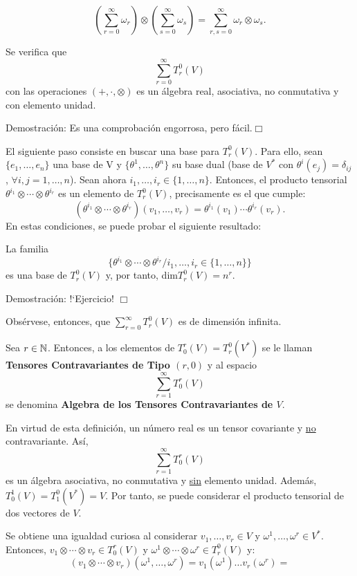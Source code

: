 \documentclass[cursovd_portada.tex]{subfiles}
\begin{document}
$$(\sum_{r=0}^\infty\omega_r)\otimes(\sum_{s=0}^\infty\omega_s)=\sum_{r,s=0}^
\infty\omega_r\otimes\omega_s.$$
\begin{propoap} Se verifica que
$$\sum_{r=0}^\infty T^0_r(V)$$
con las operaciones $(+,\cdot,\otimes)$ es un álgebra real, asociativa, no conmutativa y con elemento unidad.
\end{propoap}
{\sc Demostración:} Es una comprobación engorrosa, pero fácil.\hfill$\Box$
\par\bigskip
El siguiente paso consiste en buscar una base para $T^0_r(V)$. Para ello, sean $\{e_1,\dots ,e_n\}$ una base de V
y $\{\theta^1,\dots ,\theta^n\}$ su base dual (base de $V^*$ con $\theta^i(e_j)=\delta_{ij}$, $\forall i,j=1,\dots
, n$). Sean ahora $i_1,\dots ,i_r\in \{1,\dots, n\}$. Entonces, el producto tensorial
$\theta^{i_1}\otimes\cdots\otimes\theta^{i_r}$ es un elemento de $T^0_r(V)$, precisamente es el que cumple:
$$(\theta^{i_1}\otimes\cdots\otimes\theta^{i_r})(v_1,\dots,v_r)
=\theta^{i_1}(v_1)\cdots\theta^{i_r}(v_r).$$ En estas condiciones, se puede probar el siguiente resultado:
\begin{propoap}
La familia
$$\{\theta^{i_1}\otimes\cdots\otimes\theta^{i_r}/i_1,\dots ,i_r\in\{1,\dots,
n\}\}$$ es una base de $T^0_r(V)$ y, por tanto, dim$T^0_r(V)=n^r$.
\end{propoap}
{\sc Demostración:} !`Ejercicio! \hfill$\Box$
\par\bigskip
Obsérvese, entonces, que $\sum_{r=0}^{\infty}T^0_r(V)$ es de dimensión infinita.
\begin{defiap}
Sea $r\in\mathbb{N}$. Entonces, a los elementos de $T^r_0(V) = T^0_r(V^*)$ se le llaman {\bf Tensores Contravariantes de
Tipo $(r,0)$} y al espacio
$$\sum_{r=1}^\infty T^r_0(V)$$
se denomina {\bf Algebra de los Tensores Contravariantes de $V$}.
\end{defiap}
\par\bigskip
En virtud de esta definición, un número real es un tensor covariante y \underline{no} contravariante. Así,
$$\sum_{r=1}^{\infty} T^r_0(V)$$
es un álgebra asociativa, no conmutativa y \underline{sin} elemento unidad. Además, $T^1_0(V) =T^0_1(V^*) =V$. Por
tanto, se puede considerar el producto tensorial de dos vectores de $V$.
\par
Se obtiene una igualdad curiosa al considerar $v_1,\dots ,v_r \in V$ y $\omega^1,\dots ,\omega^r\in V^*$.
Entonces, $v_1\otimes\cdots\otimes v_r\in T^r_0(V)$ y $\omega^1\otimes\cdots\otimes\omega^r\in T^0_r(V)$ y:
$$(v_1\otimes\cdots\otimes v_r)(\omega^1,\dots ,\omega^r)=
v_1(\omega^1)\dots v_r(\omega^r)=$$
\end{document}
